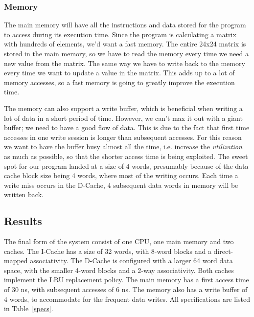 \documentclass[a4paper,9pt,fleqn]{article}
\begin{document}
\subsubsection{Memory}
The main memory will have all the instructions and data stored for the program to access during its execution time. Since the
program is calculating a matrix with hundreds of elements, we'd want a fast memory. The entire 24x24 matrix is stored in
the main memory, so we have to read the memory every time we need a new value from the matrix. The same way we have to write
back to the memory every time we want to update a value in the matrix. This adds up to a lot of memory accesses, so a 
fast memory is going to greatly improve the execution time. 

The memory can also support a write buffer, which is beneficial when writing a lot of data in a short period of time.
However, we can't max it out with a giant buffer; we need to have a good flow of data. This is due to the fact that first time
accesses in one write session is longer than subsequent accesses. For this reason we want to have the buffer busy almost
all the time, i.e. increase the {\it utilization} as much as possible, so that the shorter access time is being exploited.
The sweet spot for our program landed at a size of 4 words, presumably because of the data cache block size being 4 words, where
most of the writing occurs. Each time a write miss occurs in the D-Cache, 4 subsequent data words in memory will be written back.

\subsection{Results}
The final form of the system consist of one CPU, one main memory and two caches. The I-Cache has a
size of 32 words, with 8-word blocks and a direct-mapped associativity. The D-Cache is configured with a larger 64
word data space, with the smaller 4-word blocks and a 2-way associativity. Both caches implement the LRU replacement
policy. The main memory has a first access time of 30 ns, with subsequent accesses of 6 ns. The memory also has a
write buffer of 4 words, to accommodate for the frequent data writes. All specifications are listed in Table~\ref{specs}.
\end{document}
